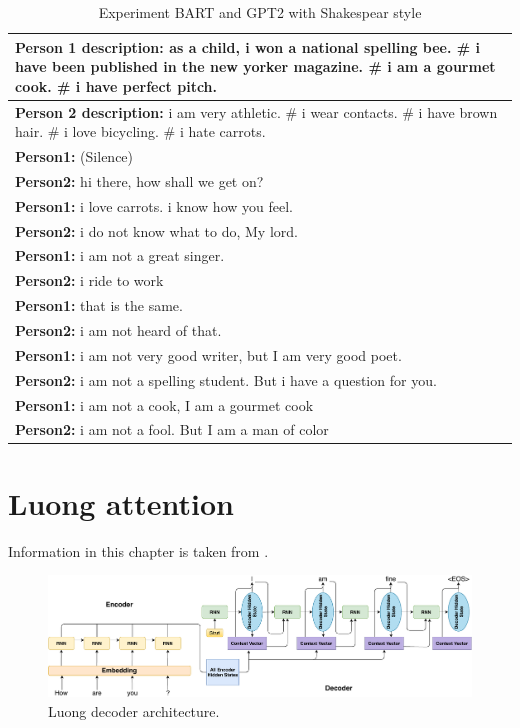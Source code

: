 \begin{table}[ht]
\centering
 \begin{tabular}{|p{14cm}|} 
 \hline\hline
 \textbf{Person 1 description:} as a child, i won a national spelling bee. \# i have been published in the new yorker magazine. \# i am a gourmet cook. \# i have perfect pitch. \\
 \hline
 \textbf{Person 2 description:} i am very athletic. \# i wear contacts. \# i have brown hair. \# i love bicycling. \# i hate carrots. \\
 \hline\hline
 \textbf{Person1:} (Silence) \\
 \textbf{Person2:} hi there, how shall we get on?  \\ 
 \textbf{Person1:} i love carrots. i know how you feel. \\
 \textbf{Person2:} i do not know what to do, My lord. \\
 \textbf{Person1:} i am not a great singer. \\
 \textbf{Person2:} i ride to work \\
 \textbf{Person1:} that is the same. \\
 \textbf{Person2:} i am not heard of that. \\
 \textbf{Person1:} i am not very good writer, but I am very good poet. \\
 \textbf{Person2:} i am not a spelling student. But i have a question for you. \\
 \textbf{Person1:} i am not a cook, I am a gourmet cook \\
 \textbf{Person2:} i am not a fool. But I am a man of color  \\
 \hline\hline
 \end{tabular}
 \caption{Experiment BART and GPT2 with Shakespear style}
\label{tab:poetic_shakespear_ap}
\end{table}

\chapter{Luong attention} \label{luong_attn_appendix}

Information in this chapter is taken from \cite{luong2015effective}.
\begin{figure}[hbt]
  \centering
  \includegraphics[width=1\textwidth]{figures/luong_decoder.pdf}
  \caption{Luong decoder architecture.}
  \label{luong}
\end{figure}

